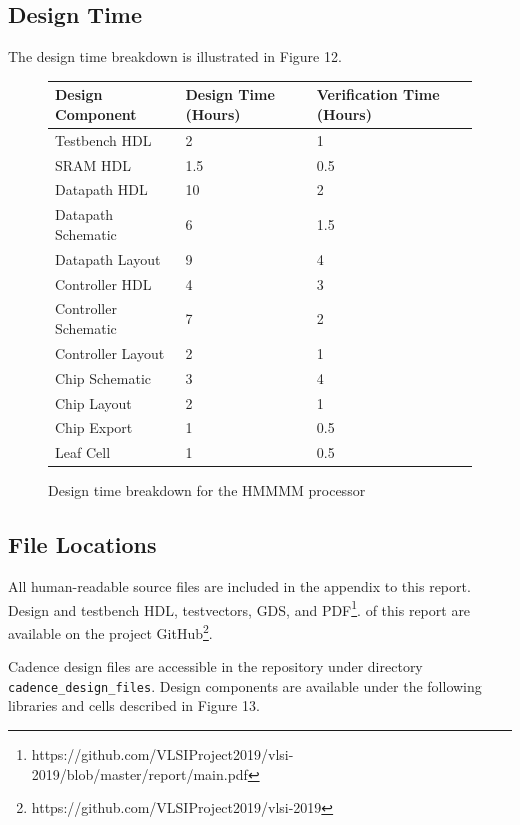\documentclass[12pt]{article}
\begin{document}
\subsection{Design Time}

The design time breakdown is illustrated in Figure 12.

\begin{figure}[H]
    \begin{center}
    \begin{tabular}{lll}
        Design Component & Design Time (Hours) & Verification Time (Hours) \\
        \hline
        Testbench HDL & 2 & 1 \\
        SRAM HDL & 1.5 & 0.5 \\
        Datapath HDL & 10 & 2 \\
        Datapath Schematic & 6 & 1.5\\
        Datapath Layout & 9 & 4 \\
        Controller HDL & 4 & 3 \\
        Controller Schematic & 7 & 2 \\
        Controller Layout & 2 & 1 \\
        Chip Schematic & 3 & 4 \\
        Chip Layout & 2 & 1\\
        Chip Export & 1 & 0.5 \\
        Leaf Cell & 1 & 0.5 \\
    \end{tabular}
    \caption{Design time breakdown for the HMMMM processor}
    \end{center}
    \label{fig:designtime}
\end{figure}

\subsection{File Locations}

All human-readable source files are included in the appendix to this report. Design and testbench HDL, testvectors, GDS, and PDF\footnote{https://github.com/VLSIProject2019/vlsi-2019/blob/master/report/main.pdf}. of this report are available on the project GitHub\footnote{https://github.com/VLSIProject2019/vlsi-2019}. 

Cadence design files are accessible in the repository under directory \texttt{cadence\_design\_files}. Design components are available under the following libraries and cells described in Figure 13.
\end{document}
